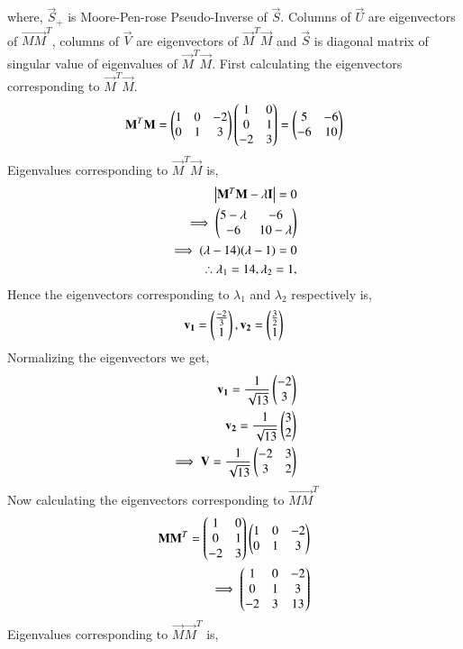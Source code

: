 \documentclass[journal,12pt,twocolumn]{IEEEtran}
\begin{document}
where, $\vec{S}_+$ is Moore-Pen-rose Pseudo-Inverse of $\vec{S}$. Columns of $\vec{U}$ are eigenvectors of $\vec{MM}^T$, columns of $\vec{V}$ are eigenvectors of $\vec{M}^T\vec{M}$ and $\vec{S}$ is diagonal matrix of singular value of eigenvalues of $\vec{M}^T\vec{M}$. First calculating the eigenvectors corresponding to $\vec{M}^T\vec{M}$.
\begin{align}
\mathbf{M}^T\mathbf{M} =  \begin{pmatrix}1&0&-2\\0&1&3\end{pmatrix} \begin{pmatrix}1&0\\0&1\\-2&3\end{pmatrix} = \begin{pmatrix}5&-6\\-6&10\end{pmatrix}
\end{align}
Eigenvalues corresponding to $\vec{M}^T\vec{M}$  is,
\begin{align}
\begin{vmatrix}\mathbf{M}^T\mathbf{M}-\lambda\mathbf{I}\end{vmatrix} = 0\\
\implies \begin{pmatrix}5-\lambda&-6\\-6&10-\lambda\end{pmatrix}\\
\implies (\lambda-14)(\lambda-1) = 0\\
\therefore \lambda_1 = 14, \lambda_2 = 1, \label{eq:lambda2}
\end{align} 
Hence the eigenvectors corresponding to $\lambda_1$ and $\lambda_2$ respectively is,
\begin{align}
\mathbf{v_1} =\begin{pmatrix}\frac{-2}{3}\\1\end{pmatrix}, \mathbf{v_2} =\begin{pmatrix}\frac{3}{2}\\1\end{pmatrix}
\end{align}
Normalizing the eigenvectors we get,
\begin{align}
\mathbf{v_1} = \frac{1}{\sqrt{13}}\begin{pmatrix}-2\\3\end{pmatrix}\\
\mathbf{v_2} = \frac{1}{\sqrt{13}}\begin{pmatrix}3\\2\end{pmatrix}\\
\implies \mathbf{V} = \frac{1}{\sqrt{13}}\begin{pmatrix}-2&3\\3&2\end{pmatrix}\label{eq:V}
\end{align}
Now calculating the eigenvectors corresponding to $\vec{MM}^T$
\begin{align}
\mathbf{MM}^T = \begin{pmatrix}1&0\\0&1\\-2&3\end{pmatrix}\begin{pmatrix}1&0&-2\\0&1&3\end{pmatrix} \\\implies \begin{pmatrix}1&0&-2\\0&1&3\\-2&3&13\end{pmatrix}
\end{align}
Eigenvalues corresponding to $\vec{M}\vec{M}^T$  is,
\end{document}

